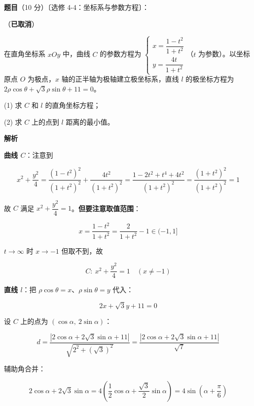 \begin{answer}

\textbf{题目}（10 分）〔选修 4-4：坐标系与参数方程〕：

（\textbf{已取消}）

在直角坐标系 $xOy$ 中，曲线 $C$ 的参数方程为 $\begin{cases}x=\dfrac{1-t^{2}}{1+t^{2}}\\[2mm] y=\dfrac{4t}{1+t^{2}}\end{cases}$（$t$ 为参数）。以坐标原点 $O$ 为极点，$x$ 轴的正半轴为极轴建立极坐标系，直线 $l$ 的极坐标方程为 $2\rho\cos\theta+\sqrt3\rho\sin\theta+11=0$。

  (1) 求 $C$ 和 $l$ 的直角坐标方程；

  (2) 求 $C$ 上的点到 $l$ 距离的最小值。

\textbf{解析}


\textbf{曲线 $C$}：注意到

\nopagebreak[4]
\[x^{2}+\frac{y^{2}}4=\frac{\left(1-t^{2}\right)^{2}}{\left(1+t^{2}\right)^{2}}+\frac{4t^{2}}{\left(1+t^{2}\right)^{2}}=\frac{1-2t^{2}+t^{4}+4t^{2}}{\left(1+t^{2}\right)^{2}}=\frac{\left(1+t^{2}\right)^{2}}{\left(1+t^{2}\right)^{2}}=1\]

故 $C$ 满足 $x^{2}+\dfrac{y^{2}}4=1$。\textbf{但要注意取值范围}：

\nopagebreak[4]
\[x=\frac{1-t^{2}}{1+t^{2}}=\frac2{1+t^{2}}-1\in(-1,1]\]

$t\to\infty$ 时 $x\to-1$ 但取不到，故

\nopagebreak[4]
\[C:\ x^{2}+\frac{y^{2}}4=1\quad(x\ne-1)\]

\textbf{直线 $l$}：把 $\rho\cos\theta=x$、$\rho\sin\theta=y$ 代入：

\nopagebreak[4]
\[2x+\sqrt3y+11=0\]


设 $C$ 上的点为 $(\cos\alpha,\ 2\sin\alpha)$：

\nopagebreak[4]
\[d=\frac{\left|2\cos\alpha+2\sqrt3\sin\alpha+11\right|}{\sqrt{2^{2}+\left(\sqrt3\right)^{2}}}=\frac{\left|2\cos\alpha+2\sqrt3\sin\alpha+11\right|}{\sqrt7}\]

辅助角合并：

\nopagebreak[4]
\[2\cos\alpha+2\sqrt3\sin\alpha=4\left(\frac12\cos\alpha+\frac{\sqrt3}2\sin\alpha\right)=4\sin\left(\alpha+\frac\pi6\right)\]


\end{answer}
